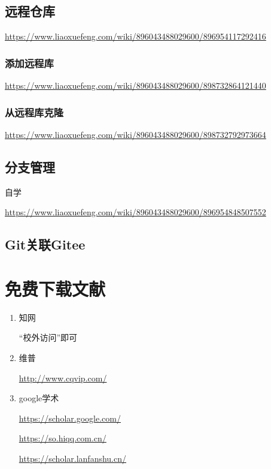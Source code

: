 \documentclass[12pt]{article}
\begin{document}
\subsection{远程仓库}
\href{https://www.liaoxuefeng.com/wiki/896043488029600/896954117292416}{https://www.liaoxuefeng.com/wiki/896043488029600/896954117292416}
\subsubsection{添加远程库}
\href{https://www.liaoxuefeng.com/wiki/896043488029600/898732864121440}{https://www.liaoxuefeng.com/wiki/896043488029600/898732864121440}
\subsubsection{从远程库克隆}
\href{https://www.liaoxuefeng.com/wiki/896043488029600/898732792973664}{https://www.liaoxuefeng.com/wiki/896043488029600/898732792973664}
\subsection{分支管理}
自学

\href{https://www.liaoxuefeng.com/wiki/896043488029600/896954848507552}{https://www.liaoxuefeng.com/wiki/896043488029600/896954848507552}

\subsection{Git关联Gitee}

\section{免费下载文献}

\begin{enumerate}
    \item 知网

“校外访问”即可

    \item 维普
    
    \href{http://www.cqvip.com/}{http://www.cqvip.com/}
    \item google学术

    \href{https://scholar.google.com/}{https://scholar.google.com/}

    \href{https://so.hiqq.com.cn/}{https://so.hiqq.com.cn/}

    \href{https://scholar.lanfanshu.cn/}{https://scholar.lanfanshu.cn/}
\end{enumerate}
\end{document}
